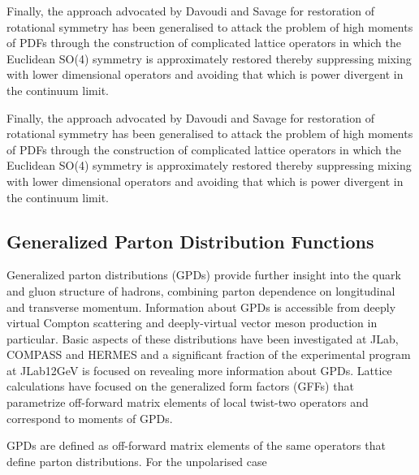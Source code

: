 Finally, the approach advocated by Davoudi and Savage \cite{Davoudi:2012ya} for restoration of rotational symmetry has been generalised to attack the 
problem of high moments of PDFs through the construction of complicated lattice operators in which the Euclidean SO(4) symmetry is approximately restored thereby suppressing mixing with lower dimensional operators and avoiding that which is power divergent in the continuum limit. 

Finally, the approach advocated by Davoudi and Savage for restoration of rotational symmetry has been generalised to attack the 
problem of high moments of PDFs through the construction of complicated lattice operators in which the Euclidean SO(4) symmetry is approximately restored thereby suppressing mixing with lower dimensional operators and avoiding that which is power divergent in the continuum limit.


\subsection{Generalized Parton Distribution Functions}

%	

Generalized parton distributions (GPDs) \cite{Ji:2001wha,Radyushkin:1997ki,Diehl:2003ny,Belitsky:2005qn} provide further insight into the quark and gluon structure of hadrons, combining parton dependence on longitudinal and transverse momentum. Information about GPDs is accessible from deeply virtual Compton scattering and deeply-virtual vector meson production in particular. Basic aspects of these distributions have been investigated at JLab, COMPASS and HERMES and a significant fraction of the experimental program at JLab12GeV is focused on revealing more  information about  GPDs. Lattice calculations have focused on the generalized form factors (GFFs) that parametrize off-forward matrix elements of local twist-two operators and correspond to moments of GPDs. 

GPDs are defined as  off-forward matrix elements of the same operators that define parton distributions. For the unpolarised case



